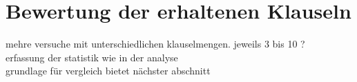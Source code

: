 \chapter{Bewertung der erhaltenen Klauseln}
\label{chp:bewertung}

mehre versuche mit unterschiedlichen klauselmengen. jeweils 3 bis 10 ?\\
erfassung der statistik wie in der analyse\\
grundlage für vergleich bietet nächster abschnitt







